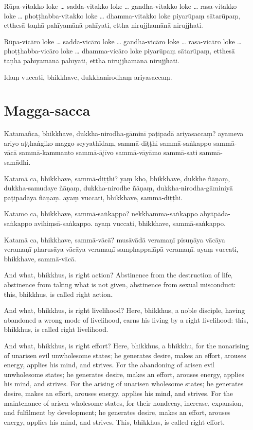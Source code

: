 \paliPage

Rūpa-vitakko loke \ldots{} sadda-vitakko loke \ldots{} gandha-vitakko loke \ldots{}
rasa-vitakko loke \ldots{} phoṭṭhabba-vitakko loke \ldots{} dhamma-vitakko loke
piyarūpaṃ sātarūpaṃ, etthesā taṇhā pahīyamānā pahīyati, ettha nirujjhamānā
nirujjhati.

Rūpa-vicāro loke \ldots{} sadda-vicāro loke \ldots{} gandha-vicāro loke \ldots{}
rasa-vicāro loke \ldots{} phoṭṭhabba-vicāro loke \ldots{} dhamma-vicāro loke
piyarūpaṃ sātarūpaṃ, etthesā taṇhā pahīyamānā pahīyati, ettha nirujjhamānā
nirujjhati.

Idaṃ vuccati, bhikkhave, dukkhanirodhaṃ ariyasaccaṃ.

\section*{Magga-sacca}

Katamañca, bhikkhave, dukkha-nirodha-gāminī paṭipadā ariyasaccaṃ? ayameva ariyo
aṭṭhaṅgiko maggo seyyathīdaṃ, sammā-diṭṭhi sammā-saṅkappo sammā-vācā
sammā-kammanto sammā-ājīvo sammā-vāyāmo sammā-sati sammā-samādhi.

Katamā ca, bhikkhave, sammā-diṭṭhi? yaṃ kho, bhikkhave, dukkhe ñāṇaṃ,
dukkha-samudaye ñāṇaṃ, dukkha-nirodhe ñāṇaṃ, dukkha-nirodha-gāminiyā paṭipadāya
ñāṇaṃ. ayaṃ vuccati, bhikkhave, sammā-diṭṭhi.

Katamo ca, bhikkhave, sammā-saṅkappo? nekkhamma-saṅkappo abyāpāda-saṅkappo
avihiṃsā-saṅkappo. ayaṃ vuccati, bhikkhave, sammā-saṅkappo.

Katamā ca, bhikkhave, sammā-vācā? musāvādā veramaṇī pisuṇāya vācāya veramaṇī
pharusāya vācāya veramaṇī samphappalāpā veramaṇī. ayaṃ vuccati, bhikkhave,
sammā-vācā.

\englishPage

And what, bhikkhus, is right action? Abstinence from the destruction of life,
abstinence from taking what is not given, abstinence from sexual misconduct:
this, bhikkhus, is called right action.

And what, bhikkhus, is right livelihood? Here, bhikkhus, a noble disciple,
having abandoned a wrong mode of livelihood, earns his living by a right
livelihood: this, bhikkhus, is called right livelihood.

And what, bhikkhus, is right effort? Here, bhikkhus, a bhikkhu, for the
nonarising of unarisen evil unwholesome states; he generates desire, makes an
effort, arouses energy, applies his mind, and strives. For the abandoning of
arisen evil unwholesome states; he generates desire, makes an effort, arouses
energy, applies his mind, and strives. For the arising of unarisen wholesome
states; he generates desire, makes an effort, arouses energy, applies his mind,
and strives. For the maintenance of arisen wholesome states, for their nondecay,
increase, expansion, and fulfilment by development; he generates desire, makes
an effort, arouses energy, applies his mind, and strives. This, bhikkhus, is
called right effort.


